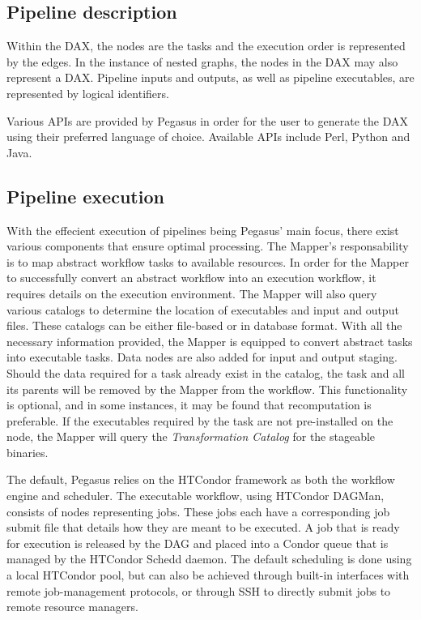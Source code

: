 \documentclass{report}
\begin{document}
        \subsection{Pipeline description}
        Within the DAX, the nodes are the tasks and the execution order is represented by the edges.
        In the instance of nested graphs, the nodes in the DAX may also represent a DAX. Pipeline inputs and outputs, as well as pipeline executables,
         are represented by logical identifiers.

         Various APIs are provided by Pegasus in order for the user to generate the
        DAX using their preferred language of choice. Available APIs include Perl, Python and Java. 
        \subsection{Pipeline execution}
        With the effecient execution of pipelines being Pegasus' main focus, there exist various components that ensure optimal processing. The Mapper's responsability is to map
        abstract workflow tasks to available resources. In order for the Mapper to successfully convert an abstract workflow into an execution workflow, it requires details on the execution
        environment. The Mapper will also query various catalogs to determine the location of executables and input and output files. These catalogs can be either file-based or in
        database format. With all the necessary information provided, the Mapper is equipped to convert abstract tasks into executable tasks. Data nodes are also added for input and output
        staging. Should the data required for a task already exist in the catalog, the task and all its parents will be removed by the Mapper from the workflow. This functionality is optional,
        and in some instances, it may be found that recomputation is preferable. If the executables required by the task are not pre-installed on the node, the Mapper will query the 
        \textit{Transformation Catalog} for the stageable binaries.

        The default, Pegasus relies on the HTCondor framework as both the workflow engine and scheduler. The executable workflow, using HTCondor DAGMan, consists of nodes representing jobs.
        These jobs each have a corresponding job submit file that details how they are meant to be executed. A job that is ready for execution is released by the DAG and placed into a Condor
        queue that is managed by the HTCondor Schedd daemon. The default scheduling is done using a local HTCondor pool, but can also be achieved through built-in interfaces with remote 
        job-management protocols, or through SSH to directly submit jobs to remote resource managers.
\end{document}
